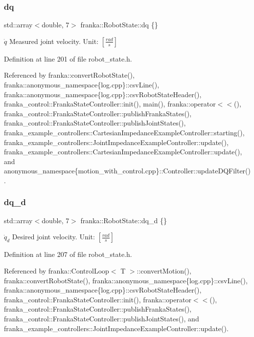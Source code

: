 \subsubsection{\texorpdfstring{dq}{dq}}
{\footnotesize\ttfamily std\+::array$<$double, 7$>$ franka\+::\+Robot\+State\+::dq \{\}}

$\dot{q}$ Measured joint velocity. Unit\+: $[\frac{rad}{s}]$ 

Definition at line 201 of file robot\+\_\+state.\+h.



Referenced by franka\+::convert\+Robot\+State(), franka\+::anonymous\+\_\+namespace\{log.\+cpp\}\+::csv\+Line(), franka\+::anonymous\+\_\+namespace\{log.\+cpp\}\+::csv\+Robot\+State\+Header(), franka\+\_\+control\+::\+Franka\+State\+Controller\+::init(), main(), franka\+::operator$<$$<$(), franka\+\_\+control\+::\+Franka\+State\+Controller\+::publish\+Franka\+States(), franka\+\_\+control\+::\+Franka\+State\+Controller\+::publish\+Joint\+States(), franka\+\_\+example\+\_\+controllers\+::\+Cartesian\+Impedance\+Example\+Controller\+::starting(), franka\+\_\+example\+\_\+controllers\+::\+Joint\+Impedance\+Example\+Controller\+::update(), franka\+\_\+example\+\_\+controllers\+::\+Cartesian\+Impedance\+Example\+Controller\+::update(), and anonymous\+\_\+namespace\{motion\+\_\+with\+\_\+control.\+cpp\}\+::\+Controller\+::update\+D\+Q\+Filter().

\mbox{\label{structfranka_1_1RobotState_aed294a088be27b927be9575a18bec949}} 
\subsubsection{\texorpdfstring{dq\+\_\+d}{dq\_d}}
{\footnotesize\ttfamily std\+::array$<$double, 7$>$ franka\+::\+Robot\+State\+::dq\+\_\+d \{\}}

$\dot{q}_d$ Desired joint velocity. Unit\+: $[\frac{rad}{s}]$ 

Definition at line 207 of file robot\+\_\+state.\+h.



Referenced by franka\+::\+Control\+Loop$<$ T $>$\+::convert\+Motion(), franka\+::convert\+Robot\+State(), franka\+::anonymous\+\_\+namespace\{log.\+cpp\}\+::csv\+Line(), franka\+::anonymous\+\_\+namespace\{log.\+cpp\}\+::csv\+Robot\+State\+Header(), franka\+\_\+control\+::\+Franka\+State\+Controller\+::init(), franka\+::operator$<$$<$(), franka\+\_\+control\+::\+Franka\+State\+Controller\+::publish\+Franka\+States(), franka\+\_\+control\+::\+Franka\+State\+Controller\+::publish\+Joint\+States(), and franka\+\_\+example\+\_\+controllers\+::\+Joint\+Impedance\+Example\+Controller\+::update().

